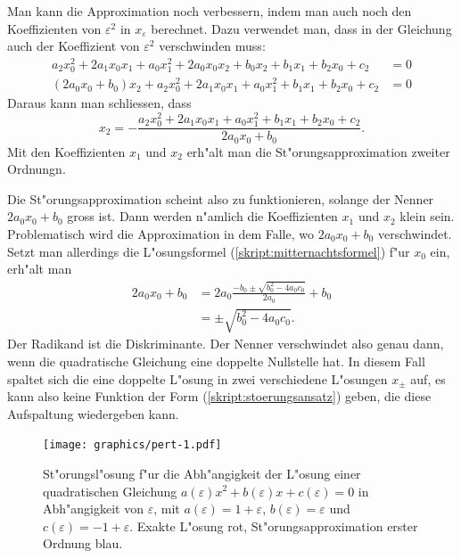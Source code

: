Man kann die Approximation noch verbessern, indem man auch noch den
Koeffizienten von $\varepsilon^2$ in $x_\varepsilon$ berechnet.
Dazu verwendet man, dass in der Gleichung auch der Koeffizient von
$\varepsilon^2$ verschwinden muss:
\begin{align*}
a_2x_0^2 + 2a_1x_0x_1 + a_0x_1^2 +2a_0x_0x_2
+b_0x_2+b_1x_1+b_2x_0
+c_2
&=0
\\
(2a_0x_0+b_0)x_2
+a_2x_0^2 + 2a_1x_0x_1 + a_0x_1^2
+b_1x_1+b_2x_0
+c_2&=0
\end{align*}
Daraus kann man schliessen, dass
\[
x_2=-\frac{
a_2x_0^2 + 2a_1x_0x_1 + a_0x_1^2
+b_1x_1+b_2x_0
+c_2
}{2a_0x_0+b_0}.
\]
Mit den Koeffizienten $x_1$ und $x_2$ erh"alt man die St"orungsapproximation
zweiter Ordnungn.

Die St"orungsapproximation scheint also zu funktionieren, solange
der Nenner $2a_0x_0+b_0$ gross ist. Dann werden n"amlich die 
Koeffizienten $x_1$ und $x_2$ klein sein. Problematisch wird
die Approximation in dem Falle, wo $2a_0x_0+b_0$ verschwindet.
Setzt man allerdings die L"osungsformel (\ref{skript:mitternachtsformel}) f"ur
$x_0$ ein, erh"alt man
\begin{align*}
2a_0x_0+b_0&=2a_0\frac{-b_0\pm\sqrt{b_0^2-4a_0c_0}}{2a_0}+b_0      \\
           &=\pm\sqrt{b_0^2-4a_0c_0}.
\end{align*}
Der Radikand ist die Diskriminante.
Der Nenner verschwindet also genau dann, wenn die quadratische
Gleichung eine doppelte Nullstelle hat. In diesem Fall spaltet sich
die eine doppelte L"osung in zwei verschiedene L"osungen $x_{\pm}$ auf,
es kann also keine Funktion der Form
(\ref{skript:stoerungsansatz}) 
geben, die diese Aufspaltung wiedergeben kann.

\begin{figure}
\centering
\texttt{[image: graphics/pert-1.pdf]}
\caption{St"orungsl"osung f"ur die Abh"angigkeit der L"osung einer
quadratischen Gleichung $a(\varepsilon)x^2+b(\varepsilon)x+c(\varepsilon)=0$
in Abh"angigkeit von $\varepsilon$,
mit $a(\varepsilon)=1+\varepsilon$, $b(\varepsilon)=\varepsilon$ und
$c(\varepsilon)=-1+\varepsilon$. Exakte L"osung {\color{red} rot}, 
St"orungsapproximation erster Ordnung {\color{blue} blau}.
\label{skript:stoerungsloesung}}
\end{figure}

